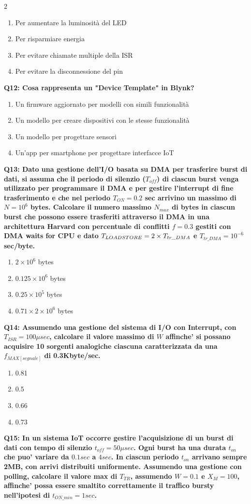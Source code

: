 \documentclass[10pt]{article}
\begin{document}
\begin{multicols}{2}
\begin{enumerate}[label=\arabic*.]
\item Per aumentare la luminosità del LED
\item Per risparmiare energia
\item Per evitare chiamate multiple della ISR
\item Per evitare la disconnessione del pin
\end{enumerate}
\textbf{Q12: Cosa rappresenta un "Device Template" in Blynk?}

\begin{enumerate}[label=\arabic*.]
\item Un firmware aggiornato per modelli con simili funzionalità
\item Un modello per creare dispositivi con le stesse funzionalità
\item Un modello per progettare sensori
\item Un'app per smartphone per progettare interfacce IoT
\end{enumerate}
\textbf{Q13: Dato una gestione dell’I/O basata su DMA per trasferire burst di dati, si assuma che il periodo di silenzio  ($T_{off}$) di ciascun burst venga utilizzato per programmare il DMA e per gestire l’interrupt di fine trasferimento e che nel periodo $T_{ON} = 0.2$ sec arrivino un massimo di $N=10^6$ bytes. Calcolare il numero massimo $N_{max}$ di bytes in ciascun burst che possono essere trasferiti attraverso il DMA in una architettura Harvard con percentuale di conflitti $f = 0.3$ gestiti con DMA waits for CPU e dato $T_{LOAD\/STORE} = 2 \times T_{tr\_DMA}$ e $T_{tr\_DMA} = 10^{-6}$ sec/byte.}

\begin{enumerate}[label=\arabic*.]
\item $2 \times 10^6$ bytes
\item $0.125 \times 10^6$ bytes
\item $0.25 \times 10^5$ bytes
\item $0.71 \times 2 \times 10^6$ bytes
\end{enumerate}
\textbf{Q14: Assumendo una gestione del sistema di I/O con Interrupt, con $T_{ISR}=100\mu sec$, calcolare il valore massimo di $W$ affinche' si possano acquisire 10 sorgenti analogiche ciascuna caratterizzata da una $f_{MAX[segnale]}$ di 0.3Kbyte/sec.}

\begin{enumerate}[label=\arabic*.]
\item 0.81
\item 0.5
\item 0.66
\item 0.73
\end{enumerate}
\textbf{Q15: In un sistema IoT occorre gestire l'acquisizione di un burst di dati con tempo di silenzio $t_{off}=50 \mu sec$. Ogni burst ha una durata $t_{on}$ che puo' variare da $0.1 sec$ a $4 sec$. In ciascun periodo $t_{on}$ arrivano sempre 2MB, con arrivi distribuiti uniformente. Assumendo una gestione con polling, calcolare il valore max di $T_{TR}$, assumendo $W=0.1$ e $X_M = 100$, affinche' possa essere smaltito correttamente il traffico bursty nell'ipotesi di $t_{ON\_min}=1 sec$.}


\end{multicols}
\end{document}
